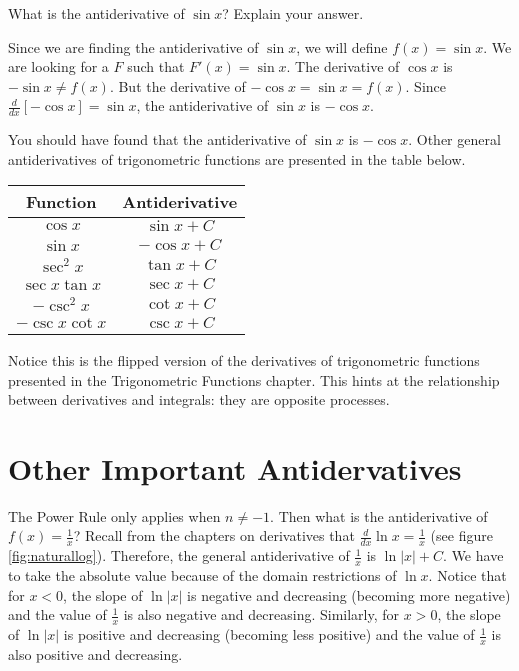 \begin{Exercise}[label=triganti]
What is the antiderivative of $\sin{x}$? Explain your answer. 
\end{Exercise}

\begin{Answer}[ref=triganti]
Since we are finding the antiderivative of $\sin{x}$, we will define 
$f(x) = \sin{x}$. We are looking for a $F$ such that $F'(x) = \sin{x}$. 
The derivative of $\cos{x}$ is $-\sin{x} \neq f(x)$. But the derivative 
of $-\cos{x} = \sin{x} = f(x)$. Since $\frac{d}{dx} [-\cos{x}] = 
\sin{x}$, the antiderivative of $\sin{x}$ is $-\cos{x}$. 
\end{Answer}

You should have found that the antiderivative of $\sin{x}$ is 
$-\cos{x}$. Other general antiderivatives of trigonometric functions 
are presented in the table below. 

\begin{center}
	\begin{tabular}{|c|c|}\hline
		Function & Antiderivative\\
		\hline
		$\cos{x}$ & $\sin{x} + C$\\
		\hline
		$\sin{x}$ & $-\cos{x} + C$\\
		\hline
		$\sec^2{x}$ & $\tan{x} + C$\\
		\hline
		$\sec{x} \tan{x}$ & $\sec{x} + C$\\
		\hline
		$-\csc^2{x}$ & $\cot{x} + C$\\
		\hline
		$-\csc{x} \cot{x}$ & $\csc{x} + C$\\
		\hline
	\end{tabular}
\end{center}


Notice this is the flipped version of the derivatives of trigonometric 
functions presented in the Trigonometric Functions chapter. This hints 
at the relationship between derivatives and integrals: they are 
opposite processes. 

\section{Other Important Antidervatives}

The Power Rule only applies when $n\neq-1$. Then what is the 
antiderivative of $f(x) = \frac{1}{x}$? Recall from the chapters on 
derivatives that $\frac{d}{dx} \ln{x} = \frac{1}{x}$ (see figure 
\ref{fig:naturallog}). Therefore, the general antiderivative of 
$\frac{1}{x}$ is $\ln{|x|} + C$. We have to take the absolute value 
because of the domain restrictions of $\ln{x}$. Notice that for $x<0$, 
the slope of $\ln{|x|}$ is negative and decreasing (becoming more 
negative) and the value of $\frac{1}{x}$ is also negative and 
decreasing. Similarly, for $x>0$, the slope of $\ln{|x|}$ is positive 
and decreasing (becoming less positive) and the value of $\frac{1}{x}$ 
is also positive and decreasing. 

